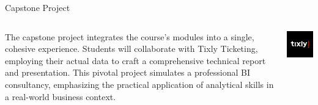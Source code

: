 \documentclass[
    NAME={Dr. Helga Ingimundardóttir},
    EMAIL={helgaingim@hi.is},
    FACULTY={Industrial Engineering},
    TITLE={Business Intelligence},
    SUBTITLE={Introduction},
    SEMINAR={IÐN610M},
    DATE={Spring, 2024}
]{HI-LaTeX/hi-beamer}
\begin{document}
    \begin{frame}{Capstone Project}
        \begin{columns}
            \begin{column}{0.7\textwidth}
                The capstone project integrates the course's modules into a single, cohesive experience.
                Students will collaborate with \alert{Tixly Ticketing},
                employing their actual data to craft a comprehensive technical report and presentation.
                \newline\newline
                This pivotal project simulates a professional BI consultancy, emphasizing
                the practical application of analytical skills in a real-world business context.
            \end{column}
            \begin{column}{0.3\textwidth}
                \includegraphics[width=\linewidth]{figures/company}
            \end{column}
        \end{columns}
    \end{frame}
\end{document}
